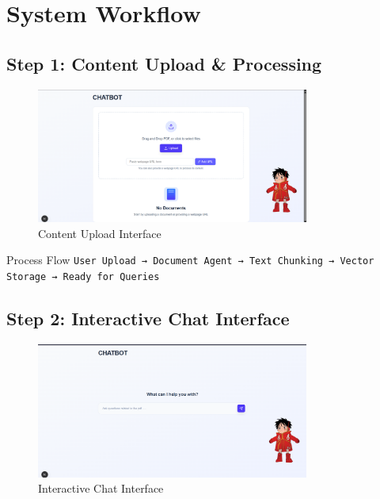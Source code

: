 \documentclass[12pt,a4paper]{article}
\begin{document}
\section{System Workflow}

\subsection{Step 1: Content Upload \& Processing}

\begin{figure}[h]
    \centering
    \includegraphics[width=0.8\textwidth]{screenshots/landing_page.png}
    \caption{Content Upload Interface}
\end{figure}

\begin{infobox}{Process Flow}
\centering
\texttt{User Upload → Document Agent → Text Chunking → Vector Storage → Ready for Queries}
\end{infobox}

\subsection{Step 2: Interactive Chat Interface}

\begin{figure}[h]
    \centering
    \includegraphics[width=0.8\textwidth]{screenshots/chat_page.png}
    \caption{Interactive Chat Interface}
\end{figure}
\end{document}
